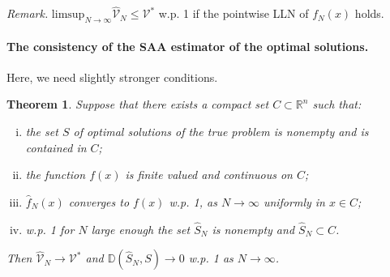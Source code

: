 \documentclass[a4pper,11pt]{article}
\newtheorem{thm}{Theorem}[section]
\begin{document}
\textit{Remark.} $\text{limsup}_{N\to \infty}\hat{\mathcal V}_N\leq \mathcal V^*$ w.p. 1 if the pointwise LLN of $f_N(x)$ holds.
\paragraph{The consistency of the SAA estimator of the optimal solutions.}
Here, we need slightly stronger conditions.
\begin{thm}
	Suppose that there exists a compact set $C\subset \mathbb R^n$ such that:
	\begin{enumerate}[(i)]
		\item the set $S$ of optimal solutions of the true problem is nonempty and is contained in $C$;
		\item the function $f(x)$ is finite valued and continuous on $C$;
		\item $\hat f_N(x)$ converges to $f(x)$ w.p. 1, as $N\to \infty$ uniformly in $x\in C$;
		\item w.p. 1 for $N$ large enough the set $\hat S_N$ is nonempty and $\hat S_N\subset C$.
	\end{enumerate}
	Then $\hat {\mathcal V}_N\to \mathcal V^*$ and $\mathbb D(\hat S_N,S)\to 0$ w.p. 1 as $N\to \infty$.
	\label{5.3}
\end{thm}
\end{document}
